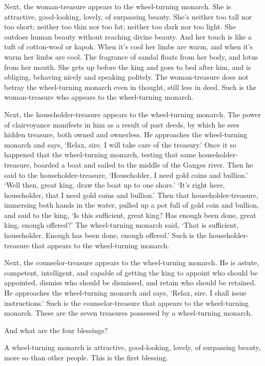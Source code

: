 \documentclass[12pt,openany]{book}%
\begin{document}
Next, the woman-treasure appears to the wheel-turning monarch. She is attractive, good-looking, lovely, of surpassing beauty. She’s neither too tall nor too short; neither too thin nor too fat; neither too dark nor too light. She outdoes human beauty without reaching divine beauty. And her touch is like a tuft of cotton-wool or kapok. When it’s cool her limbs are warm, and when it’s warm her limbs are cool. The fragrance of sandal floats from her body, and lotus from her mouth. She gets up before the king and goes to bed after him, and is obliging, behaving nicely and speaking politely. The woman-treasure does not betray the wheel-turning monarch even in thought, still less in deed. Such is the woman-treasure who appears to the wheel-turning monarch. 

Next, the householder-treasure appears to the wheel-turning monarch. The power of clairvoyance manifests in him as a result of past deeds, by which he sees hidden treasure, both owned and ownerless. He approaches the wheel-turning monarch and says, ‘Relax, sire. I will take care of the treasury.’ Once it so happened that the wheel-turning monarch, testing that same householder-treasure, boarded a boat and sailed to the middle of the Ganges river. Then he said to the householder-treasure, ‘Householder, I need gold coins and bullion.’ ‘Well then, great king, draw the boat up to one shore.’ ‘It’s right here, householder, that I need gold coins and bullion.’ Then that householder-treasure, immersing both hands in the water, pulled up a pot full of gold coin and bullion, and said to the king, ‘Is this sufficient, great king? Has enough been done, great king, enough offered?’ The wheel-turning monarch said, ‘That is sufficient, householder. Enough has been done, enough offered.’ Such is the householder-treasure that appears to the wheel-turning monarch. 

Next, the counselor-treasure appears to the wheel-turning monarch. He is astute, competent, intelligent, and capable of getting the king to appoint who should be appointed, dismiss who should be dismissed, and retain who should be retained. He approaches the wheel-turning monarch and says, ‘Relax, sire. I shall issue instructions.’ Such is the counselor-treasure that appears to the wheel-turning monarch. These are the seven treasures possessed by a wheel-turning monarch. 

And what are the four blessings? 

A wheel-turning monarch is attractive, good-looking, lovely, of surpassing beauty, more so than other people. This is the first blessing. 
\end{document}
